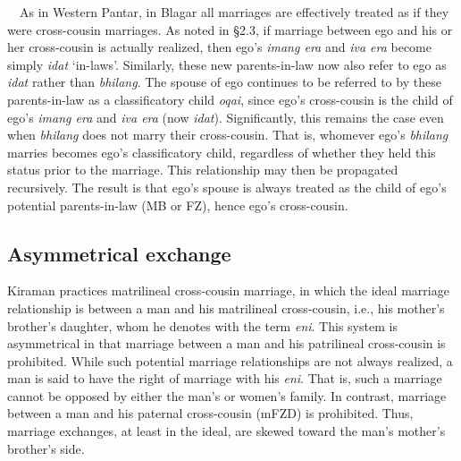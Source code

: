 \ \ As in Western Pantar, in Blagar all marriages are effectively treated as if they were cross-cousin marriages. As noted in {\S}2.3, if marriage between ego and his or her cross-cousin is actually realized, then ego{\textquoteright}s \textit{imang era }and \textit{iva era }become simply \textit{idat }{\textquoteleft}in-laws{\textquoteright}. Similarly, these new parents-in-law now also refer to ego as \textit{idat }rather than \textit{bhilang}. The spouse of ego continues to be referred to by these parents-in-law as a classificatory child \textit{oqai}, since ego{\textquoteright}s cross-cousin is the child of ego{\textquoteright}s \textit{imang era }and \textit{iva era }(now \textit{idat}). Significantly, this remains the case even when \textit{bhilang }does not marry their cross-cousin. That is, whomever ego{\textquoteright}s \textit{bhilang }marries becomes ego{\textquoteright}s classificatory child, regardless of whether they held this status prior to the marriage. This relationship may then be 
propagated recursively. The result is that ego{\textquoteright}s spouse is always treated as the child of ego{\textquoteright}s potential parents-in-law (MB or FZ), hence ego{\textquoteright}s cross-cousin.

\subsection[Asymmetrical exchange]{Asymmetrical exchange}
\hypertarget{RefHeading78039871885726}{}\label{bkm:Ref247334472}Kiraman practices matrilineal cross-cousin marriage, in which the ideal marriage relationship is between a man and his matrilineal cross-cousin, i.e., his mother{\textquoteright}s brother{\textquoteright}s daughter, whom he denotes with the term \textit{eni}. This system is asymmetrical in that marriage between a man and his patrilineal cross-cousin is prohibited. While such potential marriage relationships are not always realized, a man is said to have the right of marriage with his \textit{eni}. That is, such a marriage cannot be opposed by either the man{\textquoteright}s or women{\textquoteright}s family. In contrast, marriage between a man and his paternal cross-cousin (mFZD) is prohibited. Thus, marriage exchanges, at least in the ideal, are skewed toward the man{\textquoteright}s mother{\textquoteright}s brother{\textquoteright}s side.

